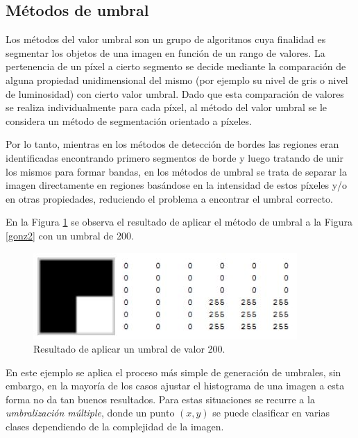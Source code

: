 \subsection{Métodos de umbral} %
\label{umbralSec}

Los métodos del valor umbral son un grupo de algoritmos cuya finalidad es segmentar los objetos de una imagen en función de un rango de valores. La pertenencia de un píxel a cierto segmento se decide mediante la comparación de alguna propiedad unidimensional del mismo (por ejemplo su nivel de gris o nivel de luminosidad) con cierto valor umbral. Dado que esta comparación de valores se realiza individualmente para cada píxel, al método del valor umbral se le considera un método de segmentación orientado a píxeles.

Por lo tanto, mientras en los métodos de detección de bordes las regiones eran identificadas encontrando primero segmentos de borde y luego tratando de unir los mismos para formar bandas, en los métodos de umbral se trata de separar la imagen directamente en regiones basándose en la intensidad de estos píxeles y/o en otras propiedades, reduciendo el problema a encontrar el umbral correcto.

En la Figura \ref{gonz3} se observa el resultado de aplicar el método de umbral a la Figura \ref{gonz2} con un umbral de 200.

\begin{figure}[H]
\begin{center}
\includegraphics[scale=0.8]{img/03_escala_grises_umbral.jpg}
\end{center}
\caption{Resultado de aplicar un umbral de valor 200.}
\label{gonz3}
\end{figure}


En este ejemplo se aplica el proceso más simple de generación de umbrales, sin embargo, en la mayoría de los casos ajustar el histograma de una imagen a esta forma no da tan buenos resultados. Para estas situaciones se recurre a la \textit{umbralización múltiple}, donde un punto $(x,y)$ se puede clasificar en varias clases dependiendo de la complejidad de la imagen.

